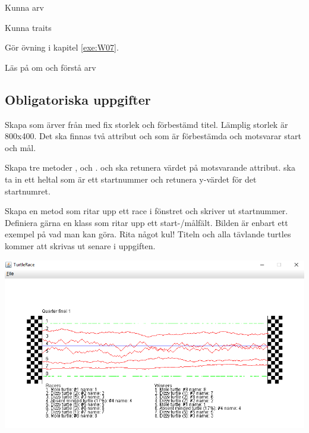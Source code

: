 

\Lab{\LabWeekSEVEN}

\begin{Goals}
\item Kunna arv
\item Kunna traits
\end{Goals}

\begin{Preparations}
\item Gör övning {\tt \ExeWeekSEVEN} i kapitel \ref{exe:W07}.
\item Läs på om och förstå arv
\end{Preparations}

\subsection{Obligatoriska uppgifter}

\Task {}

\Subtask Skapa  som ärver från  med fix storlek och förbestämd titel. Lämplig storlek är 800x400. Det ska finnas två attribut  och  som är förbestämda och motsvarar start och mål.

\Subtask Skapa tre metoder ,  och .  och  ska retunera värdet på motsvarande attribut.  ska ta in ett heltal  som är ett startnummer och retunera y-värdet för det startnumret.

\Subtask Skapa en metod  som ritar upp ett race i fönstret och skriver ut startnummer. Definiera gärna en klass som ritar upp ett start-/målfält. Bilden är enbart ett exempel på vad man kan göra. Rita något kul! Titeln och alla tävlande turtles kommer att skrivas ut senare i uppgiften.

\includegraphics[width=\textwidth]{../img/turtlerace/RaceWindow}

